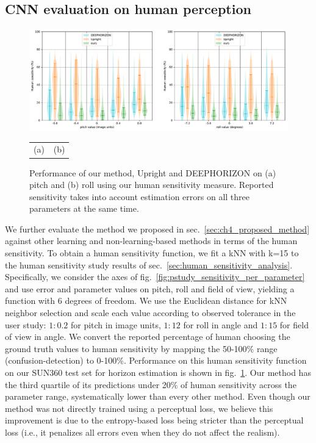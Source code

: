 \subsection{CNN evaluation on human perception}
\label{sec:cnn-evaluation-perception}

\begin{figure}
\centering
\includegraphics[width=\linewidth]{figures/method/human_sensitivity_performance_SUN360.pdf}
\begin{tabular}{p{0.5\linewidth}p{0.5\linewidth}}
\hspace{1.5cm}(a) & \hspace{1.3cm}(b)
\end{tabular}
\caption[Performance on human sensitivity measure]{Performance of our method, Upright and DEEPHORIZON on (a) pitch and (b) roll using our human sensitivity measure. Reported sensitivity takes into account estimation errors on all three parameters at the same time.}
\label{fig:method_human_performance}
\end{figure}


We further evaluate the method we proposed in sec.~\ref{sec:ch4_proposed_method} against other learning and non-learning-based methods in terms of the human sensitivity. To obtain a human sensitivity function, we fit a kNN with k=15 to the human sensitivity study results of sec.~\ref{sec:human_sensitivity_analysis}. Specifically, we consider the axes of fig.~\ref{fig:pstudy_sensitivity_per_parameter} and use error and parameter values on pitch, roll and field of view, yielding a function with 6 degrees of freedom. We use the Euclidean distance for kNN neighbor selection and scale each value according to observed tolerance in the user study: $1{:}0.2$ for pitch in image units, $1{:}12$ for roll in angle and $1{:}15$ for field of view in angle. We convert the reported percentage of human choosing the ground truth values to human sensitivity by mapping the 50-100\% range (confusion-detection) to 0-100\%. Performance on this human sensitivity function on our SUN360 test set for horizon estimation is shown in fig.~\ref{fig:method_human_performance}. Our method has the third quartile of its predictions under 20\% of human sensitivity across the parameter range, systematically lower than every other method. Even though our method was not directly trained using a perceptual loss, we believe this improvement is due to the entropy-based loss being stricter than the perceptual loss (i.e., it penalizes all errors even when they do not affect the realism).

